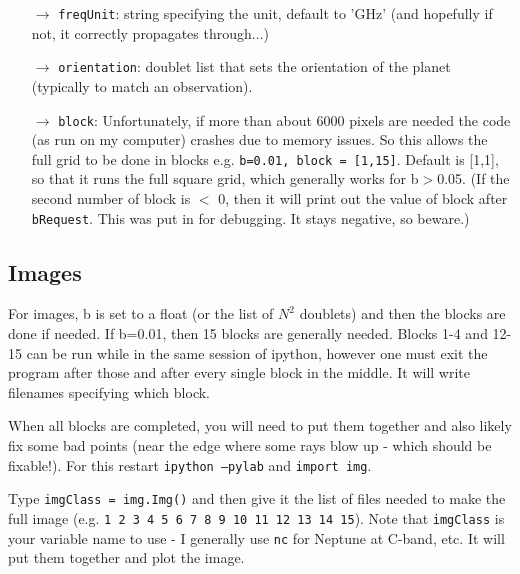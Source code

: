 \documentclass[11pt]{article}
\begin{document}
\begin{itemize}
\begin{itemize}
	\end{itemize}
\item[$\rightarrow$]  \texttt{freqUnit}:  string specifying the unit, default to 'GHz' (and hopefully if not, it correctly propagates through...)
\item[$\rightarrow$]  \texttt{orientation}:  doublet list that sets the orientation of the planet (typically to match an observation).
\item[$\rightarrow$]  \texttt{block}:  Unfortunately, if more than about 6000 pixels are needed the code (as run on my computer) crashes due to memory issues.  So this allows the full grid to be done in blocks e.g. \texttt{b=0.01, block = [1,15]}.  Default is [1,1], so that it runs the full square grid, which generally works for b$>$0.05.  (If the second number of block is $<$ 0, then it
will print out the value of block after \texttt{bRequest}.  This was put in for debugging.  It stays negative, so beware.)
\end{itemize}

\subsection{Images}
For images, b is set to a float (or the list of $N^2$ doublets) and then the blocks are done if needed.  If b=0.01, then 15 blocks are generally needed.  Blocks 1-4 and 12-15 can be run while in the same session of ipython, however one must exit the program after those and after every single block in the middle.  It will write filenames specifying which block.

When all blocks are completed, you will need to put them together and also likely fix some bad points (near the edge where some rays blow up - which should be fixable!).  For this restart \texttt{ipython --pylab} and \texttt{import img}.

Type \texttt{imgClass = img.Img()} and then give it the list of files needed to make the full image (e.g. \texttt{1 2 3 4 5 6 7 8 9 10 11 12 13 14 15}). Note that \texttt{imgClass} is your variable name to use - I generally use \texttt{nc} for Neptune at C-band, etc.  It will put them together and plot the image.    
\end{document}
